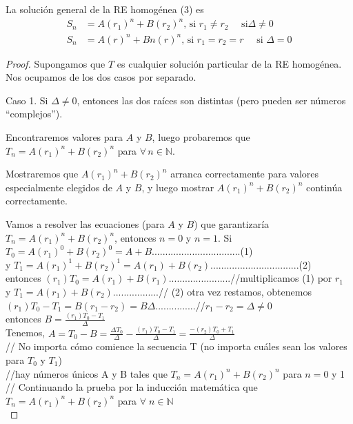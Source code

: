 \begin{theorem}
La solución general de la RE homogénea (3) es
	\begin{align*}
		S_{n}&=A(r_1)^{n}+B(r_2)^{n}\text{, si }r_{1}\neq r_{2}\quad\text{ si}\Delta\neq0\\
		S_{n}&=A(r)^n+Bn(r)^{n}\text{, si }r_{1}=r_{2}=r\quad\text{ si }\Delta=0
	\end{align*}
\end{theorem}
\begin{proof}
Supongamos que $T$ es cualquier solución particular de la RE homogénea. Nos ocupamos de los dos casos por separado.

Caso 1. Si $\Delta\neq0$, entonces las dos raíces son distintas (pero pueden ser números ``complejos'').

Encontraremos valores para $A$ y $B$, luego probaremos que $T_{n}=A(r_1)^{n}+B(r_2)^{n}$ para $\forall\,n\in\mathds{N}$.

Mostraremos que $A(r_1)^{n}+B(r_2)^{n}$ arranca correctamente para valores especialmente elegidos de $A$ y $B$, y luego mostrar $A(r_1)^{n}+B(r_2)^{n}$ continúa correctamente.

Vamos a resolver las ecuaciones (para $A$ y $B$) que garantizaría $T_{n}=A(r_1)^{n}+B(r_{2})^n$, entonces $n=0$ y $n=1$. Si
$T_0 = A(r_1)^0 + B(r_2)^0 = A + B$.................................(1)\\
y $T_1 = A(r_1)^1 + B(r_2)^1 = A(r_1) + B(r_2)$.................................(2)\\

entonces $(r_1)T_0 = A(r_1) + B(r_1)$.......................//multiplicamos (1) por $r_1$\\
y $T_1 = A(r_1) + B(r_2)$.................// (2) otra vez restamos, obtenemos\\

$(r_1)T_0 - T_1 = B(r_1 - r_2) = B\Delta$...............//$r_1 - r_2 = \Delta \neq 0$\\

entonces $B = \frac{(r_1)T_0 - T_1}{\Delta}$\\

Tenemos, $A=T_0 - B =\frac{\Delta T_0}{\Delta} -\frac{(r_1)T_0 - T_1}{\Delta} = \frac{-(r_2)T_0+T_1}{\Delta}$\\
// No importa cómo comience la secuencia T (no importa cuáles sean los valores para $T_0$ y $T_1$)\\
//hay números únicos A y B tales que $T_n = A(r_1)^n + B(r_2)^n$ para $n = 0$ y 1\\
// Continuando la prueba por la inducción matemática que $T_n= A(r_1)^n + B(r_2)^n$ para $\forall \; n \in \mathbb{N}$\\


\end{proof}
